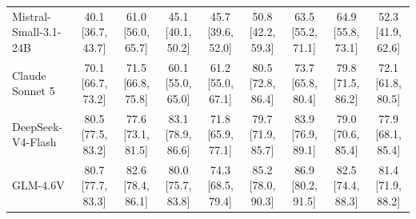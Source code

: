 \begin{table}[t]
{\begin{tabular}{lcccccccc}
Mistral-Small-3.1-24B & 40.1 \scriptsize{[36.7, 43.7]} & 61.0 \scriptsize{[56.0, 65.7]} & 45.1 \scriptsize{[40.1, 50.2]} & 45.7 \scriptsize{[39.6, 52.0]} & 50.8 \scriptsize{[42.2, 59.3]} & 63.5 \scriptsize{[55.2, 71.1]} & 64.9 \scriptsize{[55.8, 73.1]} & 52.3 \scriptsize{[41.9, 62.6]} \\
Claude Sonnet 5 & 70.1 \scriptsize{[66.7, 73.2]} & 71.5 \scriptsize{[66.8, 75.8]} & 60.1 \scriptsize{[55.0, 65.0]} & 61.2 \scriptsize{[55.0, 67.1]} & 80.5 \scriptsize{[72.8, 86.4]} & 73.7 \scriptsize{[65.8, 80.4]} & 79.8 \scriptsize{[71.5, 86.2]} & 72.1 \scriptsize{[61.8, 80.5]} \\
DeepSeek-V4-Flash & 80.5 \scriptsize{[77.5, 83.2]} & 77.6 \scriptsize{[73.1, 81.5]} & 83.1 \scriptsize{[78.9, 86.6]} & 71.8 \scriptsize{[65.9, 77.1]} & 79.7 \scriptsize{[71.9, 85.7]} & 83.9 \scriptsize{[76.9, 89.1]} & 79.0 \scriptsize{[70.6, 85.4]} & 77.9 \scriptsize{[68.1, 85.4]} \\
GLM-4.6V & 80.7 \scriptsize{[77.7, 83.3]} & 82.6 \scriptsize{[78.4, 86.1]} & 80.0 \scriptsize{[75.7, 83.8]} & 74.3 \scriptsize{[68.5, 79.4]} & 85.2 \scriptsize{[78.0, 90.3]} & 86.9 \scriptsize{[80.2, 91.5]} & 82.5 \scriptsize{[74.4, 88.3]} & 81.4 \scriptsize{[71.9, 88.2]} \\
\bottomrule\end{tabular}}\end{table}

